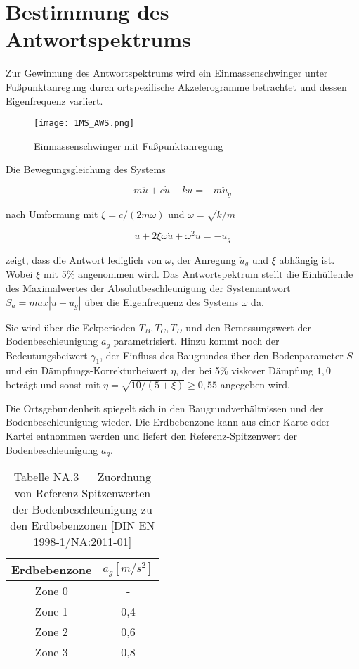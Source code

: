 \pagebreak

\section{Bestimmung des Antwortspektrums}
\label{sec:Antwortspektren}

Zur Gewinnung des Antwortspektrums wird ein Einmassenschwinger unter Fußpunktanregung durch ortspezifische Akzelerogramme betrachtet und dessen Eigenfrequenz variiert.

\begin{figure}[H]
    \centering
    \texttt{[image: 1MS\_AWS.png]}
    \caption{Einmassenschwinger mit Fußpunktanregung}
\end{figure}

Die Bewegungsgleichung des Systems

\begin{equation} \label{ems_aws}
m \ddot u + c \dot u + k u = -m \ddot u_g
\end{equation}

nach Umformung mit $\xi = c/(2m\omega)$ und $\omega = \sqrt{k/m}$

\begin{equation} \label{ems_aws_umf}
\ddot u + 2\xi\omega \dot u + \omega^2 u = - \ddot u_g
\end{equation}

zeigt, dass die Antwort lediglich von $\omega$, der Anregung $\ddot u_g$ und $\xi$ abhängig ist. Wobei $\xi$ mit 5\% angenommen wird.
Das Antwortspektrum stellt die Einhüllende des Maximalwertes der Absolutbeschleunigung der Systemantwort $S_a=max|\ddot u + \ddot u_g|$ über die Eigenfrequenz des Systems $\omega$ da. \cite{Bachmann}

Sie wird über die Eckperioden $T_B, T_C, T_D$ und den Bemessungswert der Bodenbeschleunigung $a_g$ parametrisiert. Hinzu kommt noch der Bedeutungsbeiwert $\gamma_1$, der Einfluss des Baugrundes über den Bodenparameter $S$ und ein Dämpfungs-Korrekturbeiwert $\eta$, der bei 5\% viskoser Dämpfung $1,0$ beträgt und sonst mit $\eta=\sqrt{10/(5+\xi)}\geq 0,55$ angegeben wird.

Die Ortsgebundenheit spiegelt sich in den Baugrundverhältnissen und der Bodenbeschleunigung wieder. Die Erdbebenzone kann aus einer Karte oder Kartei entnommen werden und liefert den Referenz-Spitzenwert der Bodenbeschleunigung $a_g$.

\begin{table}[H]
\centering
\begin{tabular}{ |c|c| } 
 \hline
 Erdbebenzone & $a_g [m/s^2]$ \\
 \hline\hline
 Zone 0 & - \\ 
 Zone 1 & 0,4 \\ 
 Zone 2 & 0,6 \\ 
 Zone 3 & 0,8 \\ 
 \hline
\end{tabular}
\caption{Tabelle NA.3 — Zuordnung von Referenz-Spitzenwerten der Bodenbeschleunigung zu den Erdbebenzonen [DIN EN 1998-1/NA:2011-01]}
\end{table}

